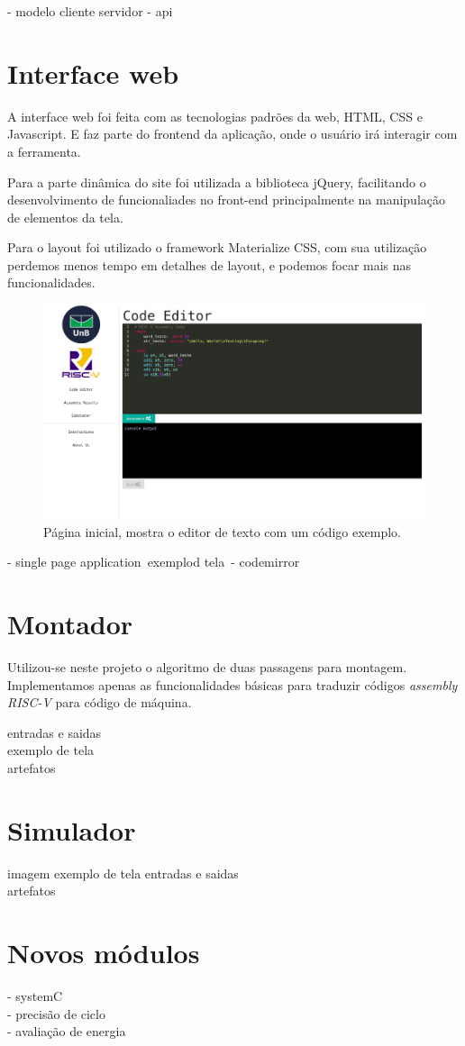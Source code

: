 	- modelo cliente servidor
	- api

\section{Interface web}

	A interface web foi feita com as tecnologias padrões da web, HTML, CSS e Javascript. E faz parte do frontend da aplicação, onde o usuário irá interagir com a ferramenta. 

	Para a parte dinâmica do site foi utilizada a biblioteca jQuery, facilitando o desenvolvimento de funcionaliades no front-end principalmente na manipulação de elementos da tela. 

	Para o layout foi utilizado o framework Materialize CSS, com sua utilização perdemos menos tempo em detalhes de layout, e podemos focar mais nas funcionalidades.


	\begin{figure}
	  \includegraphics[width=\linewidth]{img/code_editor.png}
	  \caption{Página inicial, mostra o editor de texto com um código exemplo.}
	  \label{fig:editor_texto}
	\end{figure}
	

	- single page application\
	exemplod tela\
	- codemirror\\

\section{Montador}
	

	Utilizou-se neste projeto o algoritmo de duas passagens para montagem. Implementamos apenas as funcionalidades básicas para traduzir códigos \textit{assembly RISC-V} para código de máquina. 

	entradas e saidas\\
	exemplo de tela\\

	artefatos\\

		
\section{Simulador}

	imagem exemplo de tela
	entradas e saidas\\
	artefatos\\



\section{Novos módulos}
		- systemC\\
		- precisão de ciclo\\
		- avaliação de energia\\

